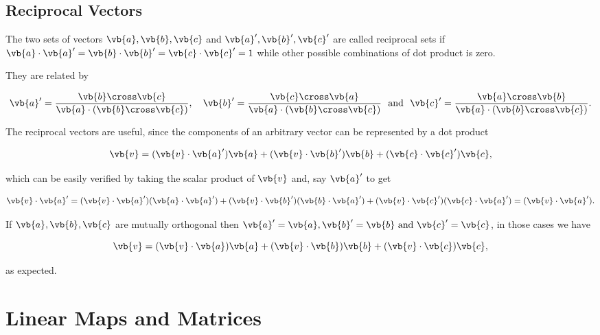 \documentclass[a4paper,12pt]{report}
\begin{document}
\section{Reciprocal Vectors}

The two sets of vectors \(\vb{a} ,\vb{b}, \vb{c} \) and \(\vb{a} ', \vb{b} ', \vb{c} '\) are called reciprocal sets if \(\vb{a} \cdot \vb{a} ' = \vb{b} \cdot \vb{b} ' = \vb{c} \cdot \vb{c} ' = 1\) while other possible combinations of dot product is zero. 

They are related by 

\begin{equation}
    \vb{a} ' = \frac{\vb{b} \cross \vb{c} }{\vb{a} \cdot (\vb{b} \cross \vb{c} )}, \quad \vb{b} ' = \frac{\vb{c}  \cross \vb{a} }{\vb{a} \cdot (\vb{b} \cross \vb{c} )} ~\text { and }~ \vb{c} '= \frac{\vb{a} \cross \vb{b} }{\vb{a} \cdot (\vb{b} \cross \vb{c} )}.   
\end{equation}

The reciprocal vectors are useful, since the components of an arbitrary vector can be represented by a dot product

\begin{equation}
    \vb{v} = (\vb{v} \cdot \vb{a} ')\vb{a} + (\vb{v} \cdot \vb{b} ')\vb{b} + (\vb{c} \cdot \vb{c} ')\vb{c} ,
\end{equation}

which can be easily verified by taking the scalar product of \(\vb{v} \) and, say \(\vb{a} '\) to get 

\begin{equation}
    \vb{v} \cdot \vb{a} ' = (\vb{v} \cdot \vb{a} ') (\vb{a} \cdot \vb{a} ') + (\vb{v} \cdot \vb{b} ')(\vb{b} \cdot \vb{a} ') + (\vb{v} \cdot \vb{c} ')(\vb{c} \cdot \vb{a} ') = (\vb{v} \cdot \vb{a} ').
\end{equation}

If \(\vb{a} ,\vb{b} ,\vb{c} \) are mutually orthogonal then \(\vb{a} ' = \vb{a} , \vb{b} ' = \vb{b} \text { and } \vb{c} '=\vb{c} \), in those cases we have

\begin{equation}
    \vb{v} = (\vb{v} \cdot \vb{a} )\vb{a} + (\vb{v} \cdot \vb{b} )\vb{b} + (\vb{v} \cdot \vb{c} )\vb{c} ,
\end{equation}

as expected.

\chapter{Linear Maps and Matrices}
\end{document}
